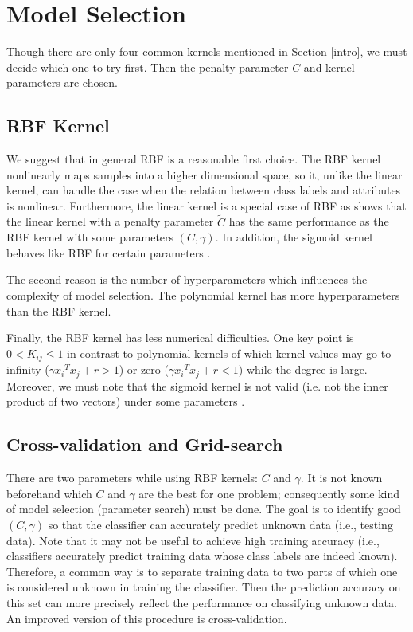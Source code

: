 \documentclass[12pt]{article}
\begin{document}
\section{Model Selection}
Though there are only four common kernels 
mentioned in Section \ref{intro}, we must decide 
which one to try first. Then the penalty parameter 
$C$ and kernel parameters are chosen.

\subsection{RBF Kernel}
We suggest that in 
general RBF is a reasonable first choice.
The RBF kernel nonlinearly maps 
samples into a higher dimensional space, so it, 
unlike the linear kernel, can handle the case when
the relation between class labels and 
attributes is nonlinear. Furthermore, the
linear kernel is a special case
of RBF as \cite{SSK02b} shows that the linear kernel 
with a penalty parameter $\tilde{C}$ has the same performance
as the RBF kernel with some parameters $(C, \gamma)$. In
addition, the sigmoid 
kernel behaves like RBF for certain parameters
\cite{HTL03a}.

The second reason is the number of hyperparameters
which influences the complexity of model selection.
The polynomial kernel has more hyperparameters
than the RBF kernel.

Finally, the RBF kernel has less numerical difficulties.
One key point is $0 < K_{ij} \leq 1$ in contrast to 
polynomial kernels of which kernel values may go to 
infinity ($\gamma {x_i}^T x_j + r > 1$) or zero 
($\gamma {x_i}^T x_j + r < 1$) while the degree is large.
Moreover, we must note that the sigmoid kernel is  
not valid (i.e. not the inner product of two vectors) 
under some parameters \cite{VV95a}.

\subsection{Cross-validation and Grid-search}
\label{cross}
There are two parameters 
while using RBF kernels: $C$ and $\gamma$. 
It is not known beforehand which $C$ and 
$\gamma$ are the best for one problem;
consequently some kind of model selection 
(parameter search) must be done. The goal is
to identify good $(C, \gamma)$ so that the classifier 
can accurately predict unknown data (i.e., testing data).
Note that it may not be useful to achieve high 
training accuracy (i.e., classifiers accurately 
predict training data whose class labels are indeed 
known). Therefore, a common way is to separate 
training data to two parts of which one is considered
unknown in training the classifier. Then the prediction
accuracy on this set can more precisely reflect the
performance on classifying unknown data. An improved version of
this procedure is cross-validation.
\end{document}
